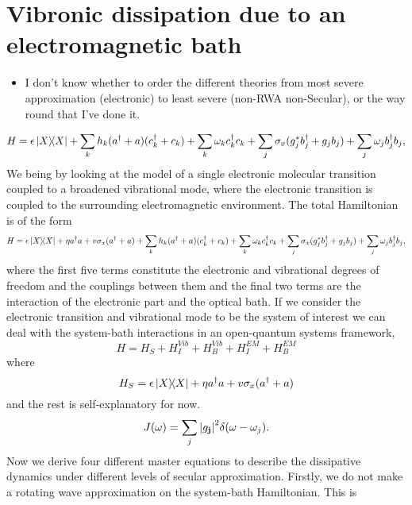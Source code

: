 \documentclass[]{article}
\begin{document}
\section{Vibronic dissipation due to an electromagnetic bath}
\begin{itemize}
	\item I don't know whether to order the different theories from most severe approximation (electronic) to least severe (non-RWA non-Secular), or the way round that I've done it.
\end{itemize}
\begin{equation}
H = \epsilon \dyad{X} + \sum_{k}h_k(a^{\dagger}+a)(c^{\dagger}_k+c_k) + \sum_{k}\omega_k c^{\dagger}_k c_k + \sum_{j}\sigma_x(g^*_jb^{\dagger}_j+g_jb_j) + \sum_{j}\omega_j b^{\dagger}_jb_j,
\end{equation}
We being by looking at the model of a single electronic molecular transition coupled to a broadened vibrational mode, where the electronic transition is coupled to the surrounding electromagnetic environment. The total Hamiltonian is of the form
\begin{equation}
H = \epsilon \dyad{X} + \eta a^{\dagger}a + v\sigma_x(a^{\dagger}+a) + \sum_{k}h_k(a^{\dagger}+a)(c^{\dagger}_k+c_k) + \sum_{k}\omega_k c^{\dagger}_k c_k + \sum_{j}\sigma_x(g^*_jb^{\dagger}_j+g_jb_j) + \sum_{j}\omega_j b^{\dagger}_jb_j,
\end{equation}
where the first five terms constitute the electronic and vibrational degrees of freedom and the couplings between them and the final two terms are the interaction of the electronic part and the optical bath. If we consider the electronic transition and vibrational mode to be the system of interest we can deal with the system-bath interactions in an open-quantum systems framework,
\begin{equation}
H = H_S + H_I^{Vib} + H_B^{Vib} + H_I^{EM}+ H_B^{EM}
\end{equation}
where 
\begin{equation}
H_S = \epsilon \dyad{X} + \eta a^{\dagger}a + v\sigma_x(a^{\dagger}+a)
\end{equation}
and the rest is self-explanatory for now.
\begin{equation}
J (\omega)= \sum_{j}\abs{g_{\textbf{j}}}^2 \delta (\omega-\omega_j).
\end{equation}
Now we derive four different master equations to describe the dissipative dynamics under different levels of secular approximation. Firstly, we do not make a rotating wave approximation on the system-bath Hamiltonian. This is 
\end{document}
